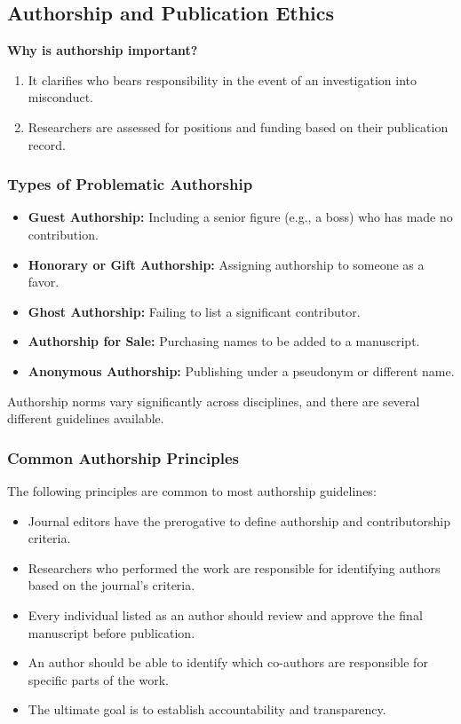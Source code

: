 \documentclass{article}
\begin{document}
\subsection{Authorship and Publication Ethics}\label{sec:authorship}

\textbf{Why is authorship important?}
\begin{enumerate}
    \item It clarifies who bears responsibility in the event of an investigation into misconduct.
    \item Researchers are assessed for positions and funding based on their publication record.
\end{enumerate}

\subsubsection{Types of Problematic Authorship}
\begin{itemize}
    \item \textbf{Guest Authorship:} Including a senior figure (e.g., a boss) who has made no contribution.
    \item \textbf{Honorary or Gift Authorship:} Assigning authorship to someone as a favor.
    \item \textbf{Ghost Authorship:} Failing to list a significant contributor.
    \item \textbf{Authorship for Sale:} Purchasing names to be added to a manuscript.
    \item \textbf{Anonymous Authorship:} Publishing under a pseudonym or different name.
\end{itemize}

Authorship norms vary significantly across disciplines, and there are several different guidelines available.

\subsubsection{Common Authorship Principles}
The following principles are common to most authorship guidelines:
\begin{itemize}
    \item Journal editors have the prerogative to define authorship and contributorship criteria.
    \item Researchers who performed the work are responsible for identifying authors based on the journal's criteria.
    \item Every individual listed as an author should review and approve the final manuscript before publication.
    \item An author should be able to identify which co-authors are responsible for specific parts of the work.
    \item The ultimate goal is to establish accountability and transparency.
\end{itemize}
\end{document}
